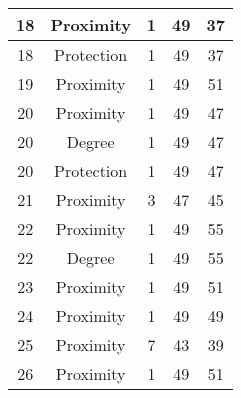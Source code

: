 \documentclass[results.tex]{subfiles}
\begin{document}
\begin{center}
\begin{tabular}{| c || c | c | c | c |}
            \hline
            18                      & Proximity                    & 1                      & 49                      & 37                   \\
            \hline
            18                      & Protection                   & 1                      & 49                      & 37                   \\
            \hline
            19                      & Proximity                    & 1                      & 49                      & 51                   \\
            \hline
            20                      & Proximity                    & 1                      & 49                      & 47                   \\
            \hline
            20                      & Degree                       & 1                      & 49                      & 47                   \\
            \hline
            20                      & Protection                   & 1                      & 49                      & 47                   \\
            \hline
            21                      & Proximity                    & 3                      & 47                      & 45                   \\
            \hline
            22                      & Proximity                    & 1                      & 49                      & 55                   \\
            \hline
            22                      & Degree                       & 1                      & 49                      & 55                   \\
            \hline
            23                      & Proximity                    & 1                      & 49                      & 51                   \\
            \hline
            24                      & Proximity                    & 1                      & 49                      & 49                   \\
            \hline
            25                      & Proximity                    & 7                      & 43                      & 39                   \\
            \hline
            26                      & Proximity                    & 1                      & 49                      & 51                   \\

\end{tabular}
\end{center}
\end{document}
